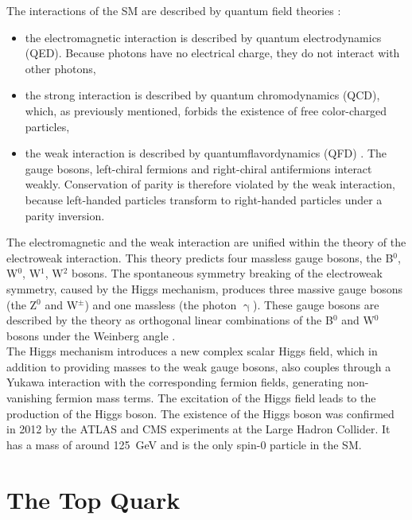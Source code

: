 The interactions of the SM are described by quantum field theories \cite{welsch}:
\begin{itemize}
\item the electromagnetic interaction is described by quantum electrodynamics (QED). Because photons have no electrical charge, they do not interact with other photons,
\item the strong interaction is described by quantum chromodynamics (QCD), which, as previously mentioned, forbids the existence of free color-charged particles,
\item the weak interaction is described by quantumflavordynamics (QFD) \cite{griffiths}. The gauge bosons, left-chiral fermions and right-chiral antifermions interact weakly. Conservation of parity is therefore violated by the weak interaction, because left-handed particles transform to right-handed particles under a parity inversion.
\end{itemize}

The electromagnetic and the weak interaction are unified within the theory of the electroweak interaction. This theory predicts four massless gauge bosons, the B$^{0}$, W$^{0}$, W$^{1}$, W$^{2}$ bosons. The spontaneous symmetry breaking of the electroweak symmetry, caused by the Higgs mechanism, produces three massive gauge bosons (the Z$^0$ and W$^{\pm}$) and one massless (the photon $\upgamma$). These gauge bosons are described by the theory as orthogonal linear combinations of the B$^{0}$ and W$^{0}$ bosons under the Weinberg angle \cite{wiki:electroweak}.\\

The Higgs mechanism introduces a new complex scalar Higgs field, which in addition to providing masses to the weak gauge bosons, also couples through a Yukawa interaction with the corresponding fermion fields, generating non-vanishing fermion mass terms. The excitation of the Higgs field leads to the production of the Higgs boson. The existence of the Higgs boson was confirmed in 2012 by the ATLAS and CMS experiments at the Large Hadron Collider. It has a mass of around \SI{125}{\giga\eV} \cite{chatrchyan} and is the only spin-0 particle in the SM.

\section{The Top Quark}
\label{sec:theory_top}

